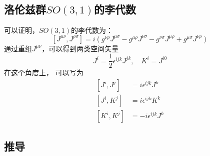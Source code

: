\subsection{洛伦兹群$SO(3,1)$的李代数}
可以证明，$SO(3,1)$的李代数为：
\begin{equation}\left[J^{\mu \nu}, J^{\rho \sigma}\right]=i\left(g^{\nu \rho} J^{\mu \sigma}-g^{\mu \rho} J^{\nu \sigma}-g^{\nu \sigma} J^{\mu \rho}+g^{\mu \sigma} J^{\nu \rho}\right)\end{equation}
通过重组$J^{\mu\nu}$，可以得到两类空间矢量
\begin{equation}J^{i}=\frac{1}{2} \epsilon^{i j k} J^{j k}, \quad K^{i}=J^{i 0}\end{equation}
在这个角度上， 可以写为
\begin{equation}\begin{aligned}
\left[J^{i}, J^{j}\right] &=i \epsilon^{i j k} J^{k} \\
\left[J^{i}, K^{j}\right] &=i \epsilon^{i j k} K^{k} \\
\left[K^{i}, K^{j}\right] &=-i \epsilon^{i j k} J^{k}
\end{aligned}\end{equation}
\subsection{推导}
